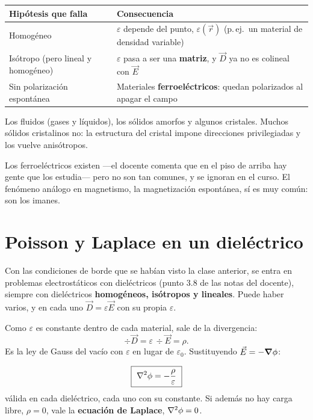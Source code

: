 \documentclass[12pt,a4paper]{article}
\begin{document}
\begin{table}[H]
  \centering
  \begin{tabularx}{\textwidth}{lX}
    \toprule
    Hipótesis que falla & Consecuencia \\
    \midrule
    Homogéneo & $\varepsilon$ depende del punto, $\varepsilon(\vec r)$ (p.\,ej.\ un material de densidad variable) \\
    Isótropo (pero lineal y homogéneo) & $\varepsilon$ pasa a ser una \textbf{matriz}, y $\vec D$ ya no es colineal con $\vec E$ \\
    Sin polarización espontánea & Materiales \textbf{ferroeléctricos}: quedan polarizados al apagar el campo \\
    \bottomrule
  \end{tabularx}
\end{table}

\begin{notebox}
Los fluidos (gases y líquidos), los sólidos amorfos y algunos cristales. Muchos
sólidos cristalinos no: la estructura del cristal impone direcciones
privilegiadas y los vuelve anisótropos.

Los ferroeléctricos existen ---el docente comenta que en el piso de arriba hay
gente que los estudia--- pero no son tan comunes, y se ignoran en el curso. El
fenómeno análogo en magnetismo, la magnetización espontánea, sí es muy común: son
los imanes.
\end{notebox}

\section{Poisson y Laplace en un dieléctrico}

Con las condiciones de borde que se habían visto la clase anterior, se entra en
problemas electrostáticos con dieléctricos (punto 3.8 de las notas del docente),
siempre con dieléctricos \textbf{homogéneos, isótropos y lineales}. Puede haber
varios, y en cada uno $\vec D = \varepsilon\vec E$ con su propia $\varepsilon$.

Como $\varepsilon$ es constante dentro de cada material, sale de la divergencia:
\[
\div\vec D = \varepsilon\, \div\vec E = \rho .
\]
Es la ley de Gauss del vacío con $\varepsilon$ en lugar de $\varepsilon_0$.
Sustituyendo $\vec E = -\grad\phi$:

\begin{keybox}
\[
\boxed{\ \laplacian\phi = -\frac{\rho}{\varepsilon}\ }
\]
válida en cada dieléctrico, cada uno con su constante. Si además no hay carga
libre, $\rho = 0$, vale la \textbf{ecuación de Laplace}, $\laplacian\phi = 0$.
\end{keybox}
\end{document}

